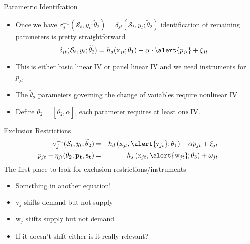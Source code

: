 \documentclass[xcolor=pdftex,dvipsnames,table,mathserif,aspectratio=169]{beamer}
\begin{document}
\begin{frame}{Parametric Identifcation}
\begin{itemize}
\item Once we have $\sigma_j^{-1}(\mathcal{S}_t,y_t;\widetilde{\theta}_2) = \delta_{jt}(\mathcal{S}_t,y_t;\widetilde{\theta}_2)$ identification of remaining parameters is pretty straightforward
\begin{eqnarray*}
\delta_{jt}(\mathcal{S}_t,y_t;\widetilde{\theta}_2)=  h_d(\mathrm{x}_{jt};\theta_1)-  \alpha \cdot \alert{ p_{jt}} + \xi_{jt}
\end{eqnarray*}
\item This is either basic linear IV or panel linear IV and we need instruments for $p_{jt}$
\item The $\widetilde{\theta}_2$ parameters governing the change of variables require \alert{nonlinear IV}
\item Define $\theta_2 =  [\widetilde{\theta}_2, \alpha]$, each parameter requires at least one IV.
\end{itemize}
\end{frame}

\begin{frame}{Exclusion Restrictions}
\begin{eqnarray*}
    \sigma_j^{-1}(\mathcal{S}_t,y_t;\widetilde{\theta}_2) &=&  h_d\left(\mathrm{x}_{jt}, \alert{\mathrm{v}_{jt}}; \theta_1 \right)  - \alpha p_{jt} + \xi_{jt}\\
    p_{jt} - \eta_{jt}(\theta_2,\mathbf{p_t},\mathbf{s_t}) &=&   h_s\left(\mathrm{x}_{jt},\alert{\mathrm{w}_{jt}};\theta_3 \right)+\omega_{jt}
\end{eqnarray*}
The first place to look for exclusion restrictions/instruments:
\begin{itemize}
\item Something in another equation!
\item $\mathrm{v}_j$ shifts demand but not supply
\item $\mathrm{w}_j$ shifts supply but not demand
\item If it doesn't shift either is it really relevant?
\end{itemize}
\end{frame}
\end{document}
